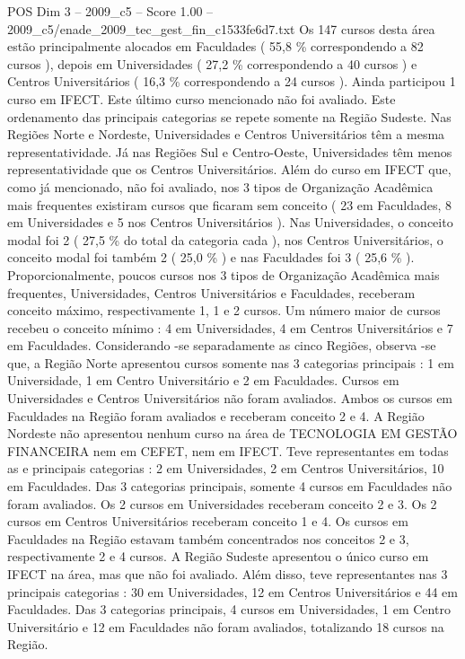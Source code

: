 \begin{textsample}{POS Dim 3 – 2009\_c5 – Score 1.00 – 2009\_c5/enade\_2009\_tec\_gest\_fin\_c1533fe6d7.txt}
Os 147 cursos desta área estão principalmente alocados em Faculdades ( 55,8 \% correspondendo a 82 cursos ), depois em Universidades ( 27,2 \% correspondendo a 40 cursos ) e Centros Universitários ( 16,3 \% correspondendo a 24 cursos ).
Ainda participou 1 curso em IFECT.
Este último curso mencionado não foi avaliado.
Este ordenamento das principais categorias se repete somente na Região Sudeste.
Nas Regiões Norte e Nordeste, Universidades e Centros Universitários têm a mesma representatividade.
Já nas Regiões Sul e Centro-Oeste, Universidades têm menos representatividade que os Centros Universitários.
Além do curso em IFECT que, como já mencionado, não foi avaliado, nos 3 tipos de Organização Acadêmica mais frequentes existiram cursos que ficaram sem conceito ( 23 em Faculdades, 8 em Universidades e 5 nos Centros Universitários ).
Nas Universidades, o conceito modal foi 2 ( 27,5 \% do total da categoria cada ), nos Centros Universitários, o conceito modal foi também 2 ( 25,0 \% ) e nas Faculdades foi 3 ( 25,6 \% ).
Proporcionalmente, poucos cursos nos 3 tipos de Organização Acadêmica mais frequentes, Universidades, Centros Universitários e Faculdades, receberam conceito máximo, respectivamente 1, 1 e 2 cursos.
Um número maior de cursos recebeu o conceito mínimo : 4 em Universidades, 4 em Centros Universitários e 7 em Faculdades.
Considerando -se separadamente as cinco Regiões, observa -se que, a Região Norte apresentou cursos somente nas 3 categorias principais : 1 em Universidade, 1 em Centro Universitário e 2 em Faculdades.
Cursos em Universidades e Centros Universitários não foram avaliados.
Ambos os cursos em Faculdades na Região foram avaliados e receberam conceito 2 e 4.
A Região Nordeste não apresentou nenhum curso na área de TECNOLOGIA EM GESTÃO FINANCEIRA nem em CEFET, nem em IFECT.
Teve representantes em todas as e principais categorias : 2 em Universidades, 2 em Centros Universitários, 10 em Faculdades.
Das 3 categorias principais, somente 4 cursos em Faculdades não foram avaliados.
Os 2 cursos em Universidades receberam conceito 2 e 3.
Os 2 cursos em Centros Universitários receberam conceito 1 e 4.
Os cursos em Faculdades na Região estavam também concentrados nos conceitos 2 e 3, respectivamente 2 e 4 cursos.
A Região Sudeste apresentou o único curso em IFECT na área, mas que não foi avaliado.
Além disso, teve representantes nas 3 principais categorias : 30 em Universidades, 12 em Centros Universitários e 44 em Faculdades.
Das 3 categorias principais, 4 cursos em Universidades, 1 em Centro Universitário e 12 em Faculdades não foram avaliados, totalizando 18 cursos na Região.

\end{textsample}
